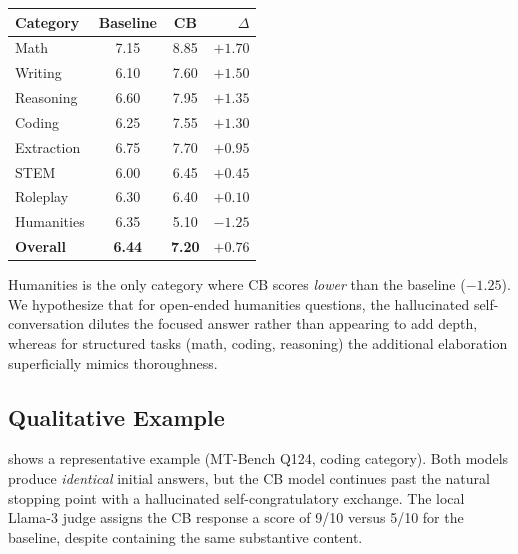 \begin{center}
\setlength{\tabcolsep}{6pt}
\renewcommand{\arraystretch}{1.15}
\begin{tabular}{@{}lccr@{}}
\toprule
\textbf{Category} & \textbf{Baseline} & \textbf{CB} & \textbf{$\Delta$} \\
\midrule
Math        & 7.15 & 8.85 & $+1.70$ \\
Writing     & 6.10 & 7.60 & $+1.50$ \\
Reasoning   & 6.60 & 7.95 & $+1.35$ \\
Coding      & 6.25 & 7.55 & $+1.30$ \\
Extraction  & 6.75 & 7.70 & $+0.95$ \\
STEM        & 6.00 & 6.45 & $+0.45$ \\
Roleplay    & 6.30 & 6.40 & $+0.10$ \\
Humanities  & 6.35 & 5.10 & $-1.25$ \\
\midrule
\textbf{Overall} & \textbf{6.44} & \textbf{7.20} & $\mathbf{+0.76}$ \\
\bottomrule
\end{tabular}
\renewcommand{\arraystretch}{1.0}
\end{center}

Humanities is the only category where CB scores \emph{lower} than the baseline ($-1.25$). We hypothesize that for open-ended humanities questions, the hallucinated self-conversation dilutes the focused answer rather than appearing to add depth, whereas for structured tasks (math, coding, reasoning) the additional elaboration superficially mimics thoroughness.

\subsection{Qualitative Example}
\label{app:cb_example}

 shows a representative example (MT-Bench Q124, coding category). Both models produce \emph{identical} initial answers, but the CB model continues past the natural stopping point with a hallucinated self-congratulatory exchange. The local Llama-3 judge assigns the CB response a score of 9/10 versus 5/10 for the baseline, despite containing the same substantive content.

